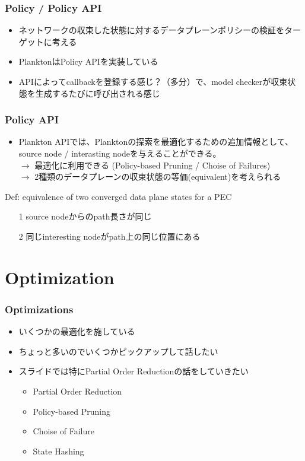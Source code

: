 \documentclass[dvipdfmx,9pt,notheorems]{beamer}
\theoremstyle{definition}
\begin{document}
\begin{frame}\frametitle{Policy / Policy API}
\begin{itemize}
	\item ネットワークの収束した状態に対するデータプレーンポリシーの検証をターゲットに考える
	\item PlanktonはPolicy APIを実装している
	\item APIによってcallbackを登録する感じ？（多分）で、model checkerが収束状態を生成するたびに呼び出される感じ
\end{itemize}
\pnote{
}
\end{frame}


\begin{frame}\frametitle{Policy API}
\begin{itemize}
	\item Plankton APIでは、Planktonの探索を最適化するための追加情報として、source node / interasting nodeを与えることができる。\\
		$\rightarrow$ 最適化に利用できる (Policy-based Pruning / Choise of Failures) \\
		$\rightarrow$ 2種類のデータプレーンの収束状態の等価(equivalent)を考えられる
\end{itemize}
\begin{block}{Def: equivalence of two converged data plane states for a PEC}
	\begin{itemize}
		\item[1] source nodeからのpath長さが同じ
		\item[2] 同じinteresting nodeがpath上の同じ位置にある
	\end{itemize}
\end{block}
\pnote{
}
\end{frame}


\section{Optimization}
\begin{frame}\frametitle{Optimizations}
\begin{itemize}
	\item いくつかの最適化を施している
	\item ちょっと多いのでいくつかピックアップして話したい
	\item スライドでは特にPartial Order Reductionの話をしていきたい
	\begin{itemize}
		\item Partial Order Reduction
		\item Policy-based Pruning
		\item Choise of Failure
		\item State Hashing
	\end{itemize}
\end{itemize}
\pnote{
}
\end{frame}
\end{document}
